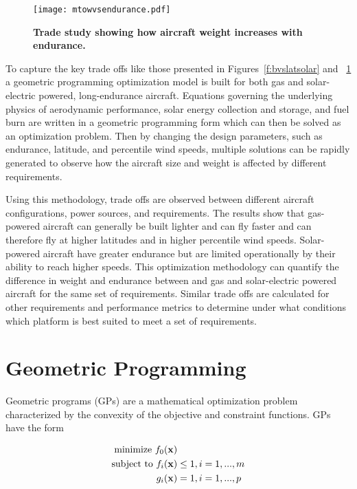 \documentclass[]{aiaa-tc}%
\begin{document}
\begin{figure}[H]
	\begin{center}
	\texttt{[image: mtowvsendurance.pdf]}
    \caption{ \textbf{ Trade study showing how aircraft weight increases with endurance.  }}
	\label{f:mtowvsendurance}
	\end{center}
\end{figure}

To capture the key trade offs like those presented in Figures~\ref{f:bvslatsolar} and ~\ref{f:mtowvsendurance} a geometric programming optimization model is built for both gas and solar-electric powered, long-endurance aircraft.  
Equations governing the underlying physics of aerodynamic performance, solar energy collection and storage, and fuel burn are written in a geometric programming form which can then be solved as an optimization problem.
Then by changing the design parameters, such as endurance, latitude, and percentile wind speeds, multiple solutions can be rapidly generated to observe how the aircraft size and weight is affected by different requirements. 

Using this methodology, trade offs are observed between different aircraft configurations, power sources, and requirements.  
The results show that gas-powered aircraft can generally be built lighter and can fly faster and can therefore fly at higher latitudes and in higher percentile wind speeds.  
Solar-powered aircraft have greater endurance but are limited operationally by their ability to reach higher speeds.  
This optimization methodology can quantify the difference in weight and endurance between and gas and solar-electric powered aircraft for the same set of requirements. 
Similar trade offs are calculated for other requirements and performance metrics to determine under what conditions which platform is best suited to meet a set of requirements.

\section{Geometric Programming\cite{gp}}

Geometric programs (GPs) are a mathematical optimization problem characterized by the convexity of the objective and constraint functions. GPs have the form

\begin{align} 
\label{e:gpform}
\text{minimize } f_0(\bold{x}) & \nonumber \\
\text{subject to  } f_i(\bold{x}) &\leq 1, i=1,...,m \\
g_i (\bold{x}) &= 1, i = 1,...,p \nonumber 
\end{align}
\end{document}
